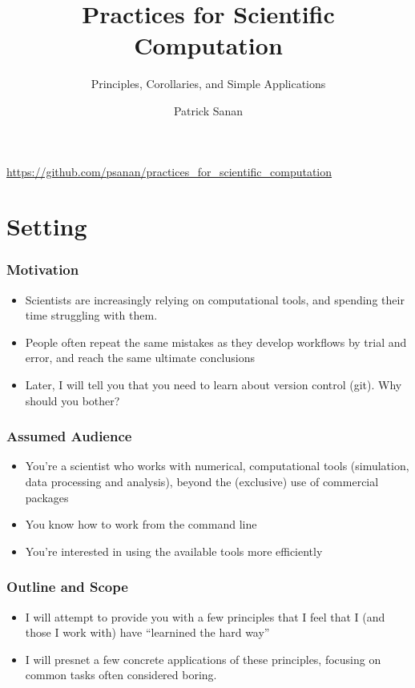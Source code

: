 \documentclass{beamer}
\author{Patrick Sanan}
\institute[ETHZ]
{
Institute of Geophysics, ETH Zurich\\
\href{mailto:patrick.sanan@erdw.ethz.ch}{patrick.sanan@erdw.ethz.ch}
}
\title{Practices for Scientific Computation}
\subtitle[]{Principles, Corollaries, and Simple Applications}
\date[]{}
\begin{document}
\begin{frame}[fragile]
\titlepage
\begin{center}
\href{https://github.com/psanan/practices_for_scientific_computation}{https://github.com/psanan/practices\_for\_scientific\_computation}
\end{center}
\end{frame}

\begin{frame}
\tableofcontents
\end{frame}

\section{Setting}

\begin{frame}[fragile]
\frametitle{Motivation}
\begin{itemize}
\item Scientists are increasingly relying on computational tools, and spending their time struggling with them.
\item People often repeat the same mistakes as they develop workflows by trial and error, and reach the same ultimate conclusions
\item Later, I will tell you that you need to learn about version control (git). Why should you bother?
\end{itemize}
\end{frame}

\begin{frame}[fragile]
\frametitle{Assumed Audience}
\begin{itemize}
\item You're a scientist who works with numerical, computational tools (simulation, data processing and analysis), beyond the (exclusive) use of commercial packages
\item You know how to work from the command line
\item You're interested in using the available tools more efficiently
\end{itemize}
\end{frame}

\begin{frame}[fragile]
\frametitle{Outline and Scope}
\begin{itemize}
  \item I will attempt to provide you with a few principles that I feel that I (and those I work with) have ``learnined the hard  way''
  \item I will presnet a few concrete applications of these principles, focusing on common tasks often considered boring.
\end{itemize}
\end{frame}
\end{document}
